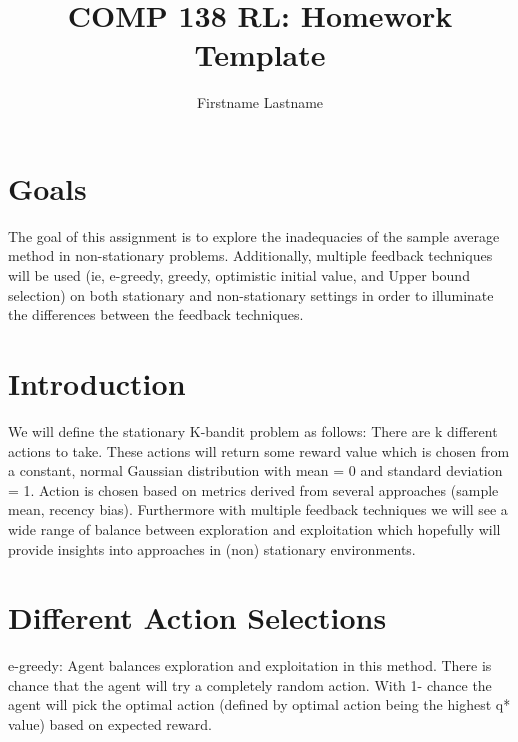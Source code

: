 \documentclass{article}
\title{COMP 138 RL: Homework Template}
\author{Firstname Lastname}
\begin{document}
\maketitle

\section{Goals}
The goal of this assignment is to explore the inadequacies of the sample average method in non-stationary problems. Additionally, multiple feedback techniques will be used (ie, e-greedy, greedy, optimistic initial value, and Upper bound selection) on both stationary and non-stationary settings in order to illuminate the differences between the feedback techniques.


\section{Introduction}
We will define the stationary K-bandit problem as follows: There are k different actions to take. These actions will return some reward value which is chosen from a constant, normal Gaussian distribution with mean = 0 and standard deviation = 1. Action is chosen based on metrics derived from several approaches (sample mean, recency bias). Furthermore with multiple feedback techniques we will see a wide range of balance between exploration and exploitation which hopefully will provide insights into approaches in (non) stationary environments. 



\section{Different Action Selections}
e-greedy: 
Agent balances exploration and exploitation in this method. There is  chance that the agent will try a completely random action. With 1- chance the agent will pick the optimal action (defined by optimal action being the highest q* value) based on expected reward. 






\end{document}
